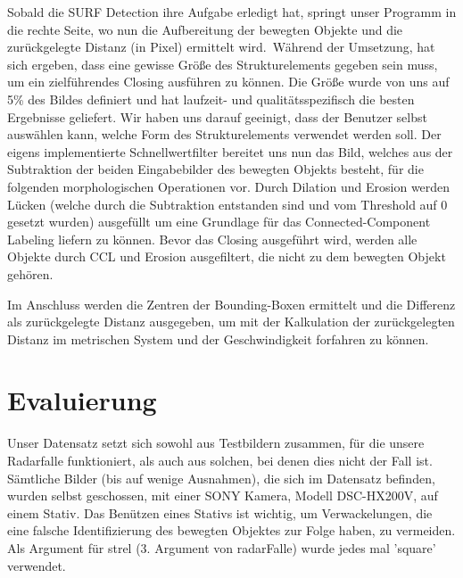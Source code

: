 \documentclass[deutsch]{scrartcl}
\begin{document}
Sobald die SURF Detection ihre Aufgabe erledigt hat, springt unser Programm in die rechte Seite, wo nun die Aufbereitung der bewegten Objekte und die zurückgelegte Distanz (in Pixel) ermittelt wird.\ 
Während der Umsetzung, hat sich ergeben, dass eine gewisse Größe des Strukturelements gegeben sein muss, um ein zielführendes Closing ausführen zu können. Die Größe wurde von uns auf 5\% des Bildes definiert und hat laufzeit- und qualitätsspezifisch die besten Ergebnisse geliefert. Wir haben uns darauf geeinigt, dass der Benutzer selbst auswählen kann, welche Form des Strukturelements verwendet werden soll. Der eigens implementierte Schnellwertfilter bereitet uns nun das Bild, welches aus der Subtraktion der beiden Eingabebilder des bewegten Objekts besteht, für die folgenden morphologischen Operationen vor. Durch Dilation und Erosion werden Lücken (welche durch die Subtraktion entstanden sind und vom Threshold auf 0 gesetzt wurden) ausgefüllt um eine Grundlage für das Connected-Component Labeling liefern zu können. Bevor das Closing ausgeführt wird, werden alle Objekte durch CCL und Erosion ausgefiltert, die nicht zu dem bewegten Objekt gehören.\

Im Anschluss werden die Zentren der Bounding-Boxen ermittelt und die Differenz als zurückgelegte Distanz ausgegeben, um mit der Kalkulation der zurückgelegten Distanz im metrischen System und der Geschwindigkeit forfahren zu können.



\section{Evaluierung}
Unser Datensatz setzt sich sowohl aus Testbildern zusammen, für die unsere Radarfalle funktioniert, als auch aus solchen, bei denen dies nicht der Fall ist. Sämtliche Bilder (bis auf wenige Ausnahmen), die sich im Datensatz befinden, wurden selbst geschossen, mit einer SONY Kamera, Modell DSC-HX200V, auf einem Stativ. Das Benützen eines Stativs ist wichtig, um Verwackelungen, die eine falsche Identifizierung des bewegten Objektes zur Folge haben, zu vermeiden. Als Argument für strel (3. Argument von radarFalle) wurde jedes mal 'square' verwendet.
\end{document}
